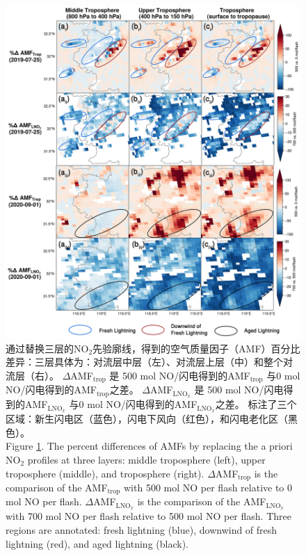 \begin{figure}[htbp]
    \centering
    \includegraphics[width=12cm]{./figures/s5p_amf_diff.png}
    \caption{
    通过替换三层的NO$_2$先验廓线，得到的空气质量因子（AMF）百分比差异：三层具体为：对流层中层（左）、对流层上层（中）和整个对流层（右）。
     $\Delta$AMF$_\textrm{trop}$ 是 500 mol NO/闪电得到的AMF$_\textrm{trop}$ 与0 mol NO/闪电得到的AMF$_\textrm{trop}$之差。
     $\Delta$AMF$_\textrm{LNO$_x$}$ 是 500 mol NO/闪电得到的AMF$_\textrm{LNO$_x$}$ 与0 mol NO/闪电得到的AMF$_\textrm{LNO$_x$}$之差。
     标注了三个区域：新生闪电区（蓝色），闪电下风向（红色），和闪电老化区（黑色）。\\
    Figure \ref{fig:s5p_amf_diff}. The percent differences of AMFs by replacing the a priori NO$_2$ profiles at three layers:
    middle troposphere (left), upper troposphere (middle), and troposphere (right).
    $\Delta$AMF$_\textrm{trop}$ is the comparison of the AMF$_\textrm{trop}$ with 500 mol NO per flash relative to 0 mol NO per flash.
    $\Delta$AMF$_\textrm{LNO$_x$}$ is the comparison of the AMF$_\textrm{LNO$_x$}$ with 700 mol NO per flash relative to 500 mol NO per flash.
    Three regions are annotated: fresh lightning (blue),
    downwind of fresh lightning (red),
    and aged lightning (black).
    }
    \label{fig:s5p_amf_diff}
\end{figure}


